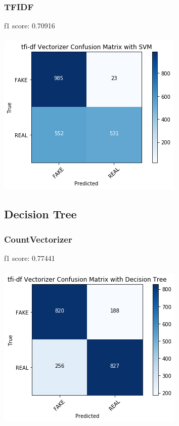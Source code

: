 \documentclass[twoside,twocolumn]{article}
\begin{document}
    \subsubsection{TFIDF}
    f1 score: 0.70916\\
    \\ \noindent \includegraphics[scale=0.6]{SVM_tfidf.png}
    
    \subsection{Decision Tree}
    \subsubsection{CountVectorizer}
    f1 score: 0.77441\\
    \\ \noindent \includegraphics[scale=0.6]{tree_count.png}
\end{document}
